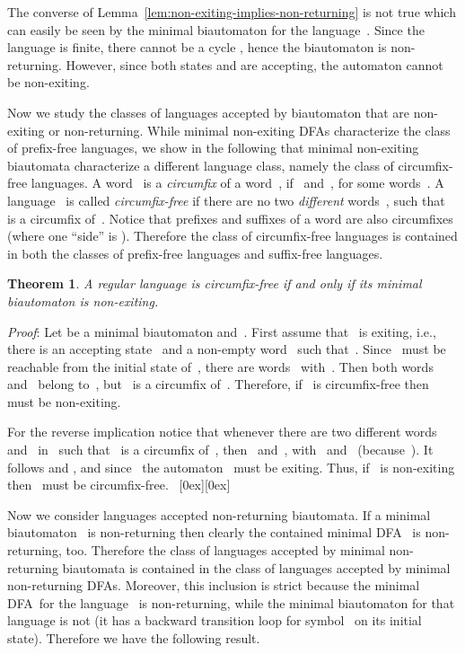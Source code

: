 \documentclass[submission]{eptcs}
\newcommand{\dfa}{\textrm{DFA}}
\newcommand*{\qed}{\raisebox{0.5ex}[0ex][0ex]{\framebox[1ex][l]{}}}
\newtheorem{theorem}{Theorem}
\newenvironment{proof}{\par\noindent
  {\rmfamily\itshape\mdseries Proof\/}:\hspace{\labelsep}\ignorespaces}{\mbox{}\nolinebreak\hfill~{\qed}
  \medbreak
}
\begin{document}
The converse of Lemma~\ref{lem:non-exiting-implies-non-returning} is
not true which can easily be seen by the minimal biautomaton for the
language~.  Since the language is finite, there cannot be a
cycle , hence the biautomaton is
non-returning.  However, since both states  and  are accepting, the automaton cannot be non-exiting.

Now we study the classes of languages accepted by biautomaton that are
non-exiting or non-returning.
While minimal non-exiting \dfa s characterize the class of prefix-free
languages, we show in the following that minimal non-exiting
biautomata characterize a different language class, namely the class
of circumfix-free languages.  A word~ is a
\emph{circumfix} of a word~, if~
and~, for some words~.  A
language~ is called \emph{circumfix-free} if there are no two
\emph{different} words~, such that~ is a circumfix of~.
Notice that prefixes and suffixes of a word are also circumfixes
(where one ``side'' is ).  Therefore the class of
circumfix-free languages is contained in both the classes of
prefix-free languages and suffix-free languages.

\begin{theorem}\label{thm:dbia-non-exiting-iff-circumfix-free}
  A regular language is circumfix-free if and only if its \emph{minimal}
  biautomaton is non-exiting.
\end{theorem}

\begin{proof}
  Let  be a minimal biautomaton
  and~.  First assume that~ is exiting, i.e., there is an
  accepting state~ and a non-empty word~ such
  that~.  Since~ must be reachable from the initial
  state of~, there are words~ with~.  Then both words~ and~ belong to~,
  but~ is a circumfix of~.  Therefore, if~ is
  circumfix-free then~ must be non-exiting.

  For the reverse implication notice that whenever there are two
  different words~ and~ in~ such that~ is a circumfix
  of~, then~ and~,
  with~ and~ (because~).
  It follows  and , and since~ the automaton~
  must be exiting.  Thus, if~ is non-exiting then~ must be
  circumfix-free.
\end{proof}

Now we consider languages accepted non-returning biautomata.  If a
minimal biautomaton~ is non-returning then clearly the contained
minimal \dfa~ is non-returning, too.  Therefore the class of
languages accepted by minimal non-returning biautomata is contained in
the class of languages accepted by minimal non-returning \dfa s.
Moreover, this inclusion is strict because the minimal \dfa\ for the
language~ is non-returning, while the minimal biautomaton for
that language is not (it has a backward transition loop for symbol~
on its initial state).  Therefore we have the following result.
\end{document}
